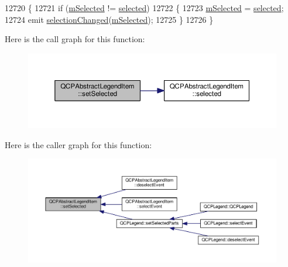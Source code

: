 \begin{DoxyCode}
12720 \{
12721   \textcolor{keywordflow}{if} (\hyperlink{class_q_c_p_abstract_legend_item_ae58ebebbd0c36cc6fe897483369984d2}{mSelected} != \hyperlink{class_q_c_p_abstract_legend_item_ac776e68e3367704452131c6aa9908bb9}{selected})
12722   \{
12723     \hyperlink{class_q_c_p_abstract_legend_item_ae58ebebbd0c36cc6fe897483369984d2}{mSelected} = \hyperlink{class_q_c_p_abstract_legend_item_ac776e68e3367704452131c6aa9908bb9}{selected};
12724     emit \hyperlink{class_q_c_p_abstract_legend_item_a7cb61fdfbaf69c590bacb8f9e7099d9e}{selectionChanged}(\hyperlink{class_q_c_p_abstract_legend_item_ae58ebebbd0c36cc6fe897483369984d2}{mSelected});
12725   \}
12726 \}
\end{DoxyCode}


Here is the call graph for this function\+:\nopagebreak
\begin{figure}[H]
\begin{center}
\leavevmode
\includegraphics[width=350pt]{class_q_c_p_abstract_legend_item_a6eed93b0ab99cb3eabb043fb08179c2b_cgraph}
\end{center}
\end{figure}




Here is the caller graph for this function\+:\nopagebreak
\begin{figure}[H]
\begin{center}
\leavevmode
\includegraphics[width=350pt]{class_q_c_p_abstract_legend_item_a6eed93b0ab99cb3eabb043fb08179c2b_icgraph}
\end{center}
\end{figure}


